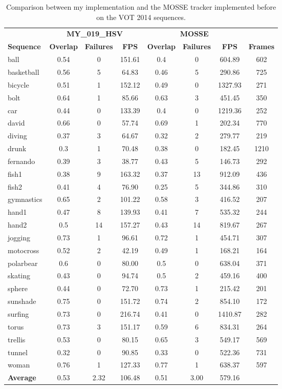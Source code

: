 \begin{table}
\begin{center}
\begin{tabular}{| l | c c c | c c c | c |}
\hline 
\multicolumn{1}{|c|}{} & \multicolumn{3}{c|}{\bf MY\_019\_HSV} &  \multicolumn{3}{c|}{\bf MOSSE} &  \multicolumn{1}{c|}{}\\
{\bf Sequence} & {\bf Overlap} & {\bf Failures} & {\bf FPS} & {\bf Overlap} & {\bf Failures} & {\bf FPS} & {\bf Frames}\\ 
\hline 
ball & 0.54 & 0 & 151.61 & 0.4 & 0 & 604.89 & 602\\
basketball & 0.56 & 5 & 64.83 & 0.46 & 5 & 290.86 & 725\\
bicycle & 0.51 & 1 & 152.12 & 0.49 & 0 & 1327.93 & 271\\
bolt & 0.64 & 1 & 85.66 & 0.63 & 3 & 451.45 & 350\\
car & 0.44 & 0 & 133.39 & 0.4 & 0 & 1219.36 & 252\\
david & 0.66 & 0 & 57.74 & 0.69 & 1 & 202.34 & 770\\
diving & 0.37 & 3 & 64.67 & 0.32 & 2 & 279.77 & 219\\
drunk & 0.3 & 1 & 70.48 & 0.38 & 0 & 182.45 & 1210\\
fernando & 0.39 & 3 & 38.77 & 0.43 & 5 & 146.73 & 292\\
fish1 & 0.38 & 9 & 163.32 & 0.37 & 13 & 912.09 & 436\\
fish2 & 0.41 & 4 & 76.90 & 0.25 & 5 & 344.86 & 310\\
gymnastics & 0.65 & 2 & 101.22 & 0.58 & 3 & 416.52 & 207\\
hand1 & 0.47 & 8 & 139.93 & 0.41 & 7 & 535.32 & 244\\
hand2 & 0.5 & 14 & 157.27 & 0.43 & 14 & 819.67 & 267\\
jogging & 0.73 & 1 & 96.61 & 0.72 & 1 & 454.71 & 307\\
motocross & 0.52 & 2 & 42.19 & 0.49 & 1 & 168.21 & 164\\
polarbear & 0.6 & 0 & 80.00 & 0.5 & 0 & 638.04 & 371\\
skating & 0.43 & 0 & 94.74 & 0.5 & 2 & 459.16 & 400\\
sphere & 0.44 & 0 & 72.70 & 0.73 & 1 & 215.42 & 201\\
sunshade & 0.75 & 0 & 151.72 & 0.74 & 2 & 854.10 & 172\\
surfing & 0.73 & 0 & 216.74 & 0.41 & 0 & 1410.87 & 282\\
torus & 0.73 & 3 & 151.17 & 0.59 & 6 & 834.31 & 264\\
trellis & 0.53 & 0 & 80.15 & 0.65 & 3 & 549.17 & 569\\
tunnel & 0.32 & 0 & 90.85 & 0.33 & 0 & 522.36 & 731\\
woman & 0.76 & 1 & 127.33 & 0.77 & 1 & 638.37 & 597\\
\hline
{\bf Average} & 0.53 & 2.32 & 106.48 & 0.51 & 3.00 & 579.16 & \\
\hline 

\end{tabular}
\end{center}
\caption{Comparison between my implementation and the MOSSE tracker implemented before on the VOT 2014 sequences.}
\label{tbl:my_vs_mosse}
\end{table}